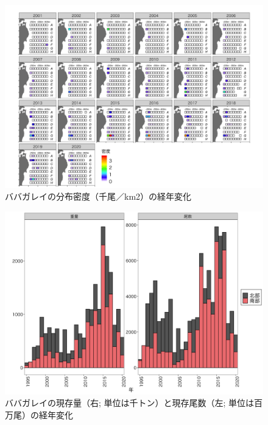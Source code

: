 \documentclass[11pt]{article} %
\begin{document}
\begin{linenumbers}
\begin{figure}[h]
  \centering
  \includegraphics[width = 14cm]{ババガレイdens.png}
  \caption{ババガレイの分布密度（千尾／km2）の経年変化}
\end{figure}

\begin{figure}[h]
  \centering
  \includegraphics[width = 14cm]{ババガレイtrend.png}
  \caption{ババガレイの現存量（右; 単位は千トン）と現存尾数（左; 単位は百万尾）の経年変化}
\end{figure}


\end{linenumbers}
\end{document}
